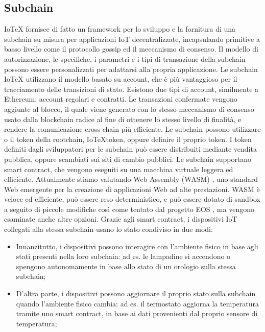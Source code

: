 \subsection{Subchain}
IoTeX fornisce di fatto un framework per lo sviluppo e la fornitura di una subchain su misura per applicazioni IoT decentralizzate, incapsulando primitive a basso livello come il protocollo gossip ed il meccanismo di consenso. Il modello di autorizzazione, le specifiche, i parametri e i tipi di transazione della subchain possono essere personalizzati per adattarsi alla propria applicazione.
Le subchain IoTeX utilizzano il modello basato su account, che è più vantaggioso per il tracciamento delle transizioni di stato.
Esistono due tipi di account, similmente a Ethereum: account regolari e contratti. Le transazioni confermate vengono aggiunte al blocco, il quale viene generato con lo stesso meccanismo di consenso usato dalla blockchain radice al fine di ottenere lo stesso livello di finalità, e rendere la comunicazione cross-chain più efficiente. Le subchain possono utilizzare o il token della rootchain, IoTeXtoken, oppure definire il proprio token. I token definiti dagli sviluppatori per le subchain può essere distribuiti mediante vendita pubblica, oppure scambiati sui siti di cambio pubblici.
Le subchain supportano smart contract, che vengono eseguiti su una macchina virtuale leggera ed efficiente. Attualmente stiamo valutando Web Assembly (WASM) \cite{c36}, uno standard Web emergente per la creazione di applicazioni Web ad alte prestazioni. WASM è veloce ed efficiente, può essere reso deterministico, e può essere dotato di sandbox a seguito di piccole modifiche così come tentato dal progetto EOS \cite{c9}, ma vengono esaminate anche altre opzioni. Grazie agli smart contract, i dispositivi IoT collegati alla stessa subchain usano lo stato condiviso in due modi:

\begin{itemize}
	\item Innanzitutto, i dispositivi possono interagire con l'ambiente fisico in base agli stati presenti nella loro subchain: ad es. le lampadine si accendono o spengono autonomamente in base allo stato di un orologio sulla stessa subchain;

	\item D'altra parte, i dispositivi possono aggiornare il proprio stato sulla subchain quando l'ambiente fisico cambia: ad es. il termostato aggiorna la temperatura tramite uno smart contract, in base ai dati provenienti dal proprio sensore di temperatura;
\end{itemize}

